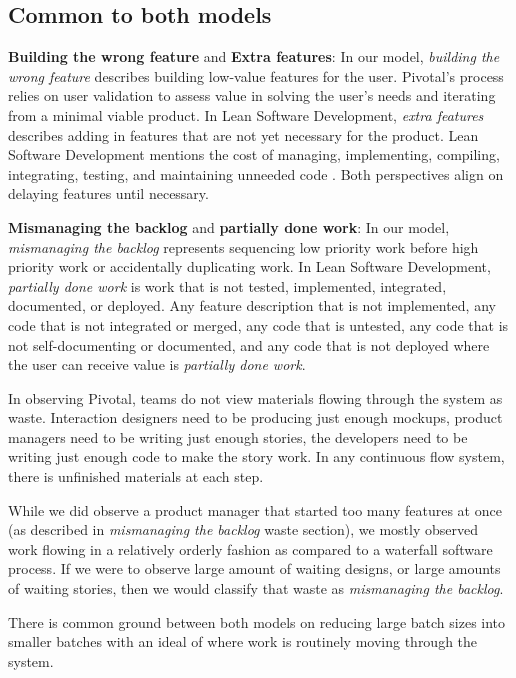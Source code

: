 \subsection{Common to both models}
\textbf{Building the wrong feature} and \textbf{Extra features}: In our model, \textit{building the wrong feature} describes building low-value features for the user. Pivotal's process relies on user validation to assess value in solving the user's needs and iterating from a minimal viable product. In Lean Software Development, \textit{extra features} describes adding in features that are not yet necessary for the product. Lean Software Development mentions the cost of managing, implementing, compiling, integrating, testing, and maintaining unneeded code \cite{PoppendieckLeanSoftwareDevelopment}.  Both perspectives align on delaying features until necessary. 

\textbf{Mismanaging the backlog} and \textbf{partially done work}: In our model, \textit{mismanaging the backlog} represents sequencing low priority work before high priority work or accidentally duplicating work. In Lean Software Development, \textit{partially done work} is work that is not tested, implemented, integrated, documented, or deployed. Any feature description that is not implemented, any code that is not integrated or merged, any code that is untested, any code that is not self-documenting or documented, and any code that is not deployed where the user can receive value is \textit{partially done work}.

In observing Pivotal, teams do not view materials flowing through the system as waste. Interaction designers need to be producing just enough mockups, product managers need to be writing just enough stories, the developers need to be writing just enough code to make the story work. In any continuous flow system, there is unfinished materials at each step. 

While we did observe a product manager that started too many features at once (as described in \textit{mismanaging the backlog} waste section), we mostly observed work flowing in a relatively orderly fashion as compared to a waterfall software process. If we were to observe large amount of waiting designs, or large amounts of waiting stories, then we would classify that waste as \textit{mismanaging the backlog}.

There is common ground between both models on reducing large batch sizes into smaller batches with an ideal of   where work is routinely moving through the system. 

